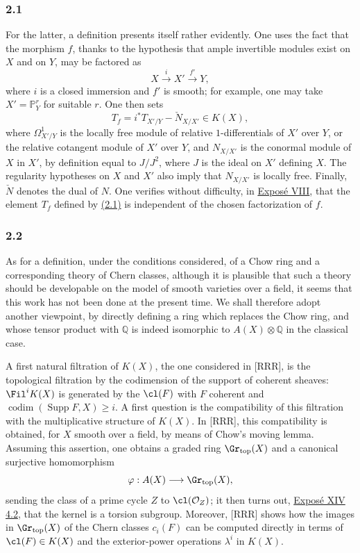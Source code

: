 \subsubsection*{2.1}
For the latter, a definition presents itself rather evidently. One uses the fact that the morphism $f$, thanks to the hypothesis that ample invertible modules exist on $X$ and on $Y$, may be factored as
\[
X\xrightarrow{i}X'\xrightarrow{f'}Y,
\]
where $i$ is a closed immersion and $f'$ is smooth; for example, one may take $X'=\mathbb P^r_Y$ for suitable $r$. One then sets
\begin{equation}\tag{2.1}
T_f=i^*T_{X'/Y}-\check N_{X/X'}\in K(X),
\end{equation}
where $\Omega^1_{X'/Y}$ is the locally free module of relative $1$-differentials of $X'$ over $Y$, or the relative cotangent module of $X'$ over $Y$, and $N_{X/X'}$ is the conormal module of $X$ in $X'$, by definition equal to $J/J^2$, where $J$ is the ideal on $X'$ defining $X$. The regularity hypotheses on $X$ and $X'$ also imply that $N_{X/X'}$ is locally free. Finally, $\check N$ denotes the dual of $N$. One verifies without difficulty, in \hyperlink{sga6.e08.expose}{Exposé VIII}, that the element $T_f$ defined by \hyperlink{sga6.e00.eq.2-1}{(2.1)} is independent of the chosen factorization of $f$.

\subsubsection*{2.2}
As for a definition, under the conditions considered, of a Chow ring and a corresponding theory of Chern classes, although it is plausible that such a theory should be developable on the model of smooth varieties over a field, it seems that this work has not been done at the present time. We shall therefore adopt another viewpoint, by directly defining a ring which replaces the Chow ring, and whose tensor product with $\mathbb Q$ is indeed isomorphic to $A(X)\otimes\mathbb Q$ in the classical case.

A first natural filtration of $K(X)$, the one considered in [RRR], is the topological filtration by the codimension of the support of coherent sheaves: $\Fil^iK(X)$ is generated by the $\cl(F)$ with $F$ coherent and $\operatorname{codim}(\operatorname{Supp}F,X)\ge i$. A first question is the compatibility of this filtration with the multiplicative structure of $K(X)$. In [RRR], this compatibility is obtained, for $X$ smooth over a field, by means of Chow's moving lemma. Assuming this assertion, one obtains a graded ring $\Gr_{\mathrm{top}}(X)$ and a canonical surjective homomorphism
\[
\varphi:A(X)\longrightarrow \Gr_{\mathrm{top}}(X),
\]
sending the class of a prime cycle $Z$ to $\cl(\mathcal O_Z)$; it then turns out, \hyperlink{sga6.e14.para.4-2}{Exposé XIV 4.2}, that the kernel is a torsion subgroup. Moreover, [RRR] shows how the images in $\Gr_{\mathrm{top}}(X)$ of the Chern classes $c_i(F)$ can be computed directly in terms of $\cl(F)\in K(X)$ and the exterior-power operations $\lambda^i$ in $K(X)$.

